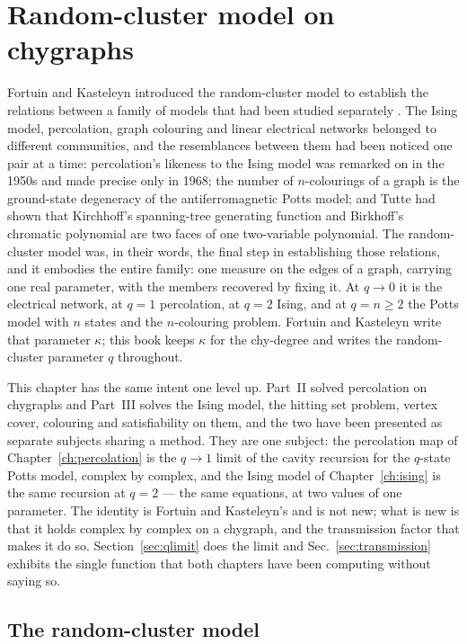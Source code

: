 \chapter{Random-cluster model on chygraphs}
\label{ch:potts}

Fortuin and Kasteleyn introduced the random-cluster model to establish the
relations between a family of models that had been studied separately
\citep{fortuin1972}. The Ising model, percolation, graph colouring and linear
electrical networks belonged to different communities, and the resemblances
between them had been noticed one pair at a time: percolation's likeness to the
Ising model was remarked on in the 1950s and made precise only in 1968; the
number of $n$-colourings of a graph is the ground-state degeneracy of the
antiferromagnetic Potts model; and Tutte had shown that Kirchhoff's
spanning-tree generating function and Birkhoff's chromatic polynomial are two
faces of one two-variable polynomial. The random-cluster model was, in their
words, the final step in establishing those relations, and it embodies the
entire family: one measure on the edges of a graph, carrying one real parameter,
with the members recovered by fixing it. At $q\to0$ it is the electrical
network, at $q=1$ percolation, at $q=2$ Ising, and at $q=n\ge2$ the Potts model
with $n$ states and the $n$-colouring problem. Fortuin and Kasteleyn write that
parameter $\kappa$; this book keeps $\kappa$ for the chy-degree and writes the
random-cluster parameter $q$ throughout.

This chapter has the same intent one level up. Part~II solved percolation on
chygraphs and Part~III solves the Ising model, the hitting set problem, vertex
cover, colouring and satisfiability on them, and the two have been presented as
separate subjects sharing a method. They are one subject: the percolation map of
Chapter~\ref{ch:percolation} is the $q\to1$ limit of the cavity recursion for
the $q$-state Potts model, complex by complex, and the Ising model of
Chapter~\ref{ch:ising} is the same recursion at $q=2$ --- the same equations, at
two values of one parameter. The identity is Fortuin and Kasteleyn's and is not
new; what is new is that it holds complex by complex on a chygraph, and the
transmission factor that makes it do so. Section~\ref{sec:qlimit} does the
limit and Sec.~\ref{sec:transmission} exhibits the single function that both
chapters have been computing without saying so.

\section{The random-cluster model}
\label{sec:rc}

